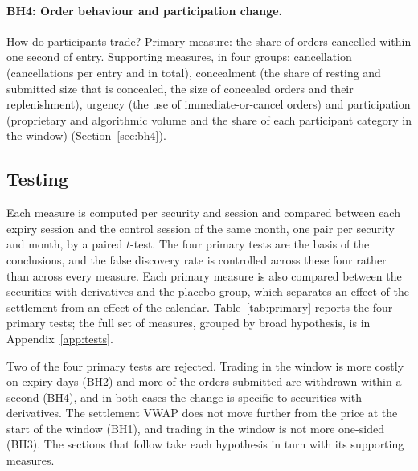 \paragraph{BH4: Order behaviour and participation change.} How do participants trade? Primary
measure: the share of orders cancelled within one second of entry. Supporting measures, in four
groups: cancellation (cancellations per entry and in total), concealment (the share of resting
and submitted size that is concealed, the size of concealed orders and their replenishment),
urgency (the use of immediate-or-cancel orders) and participation (proprietary and algorithmic
volume and the share of each participant category in the window) (Section~\ref{sec:bh4}).

\subsection{Testing}

Each measure is computed per security and session and compared between each expiry session and
the control session of the same month, one pair per security and month, by a paired $t$-test.
The four primary tests are the basis of the conclusions, and the false discovery rate is
controlled across these four rather than across every measure. Each primary measure is also
compared between the securities with derivatives and the placebo group, which separates an
effect of the settlement from an effect of the calendar. Table~\ref{tab:primary} reports the
four primary tests; the full set of measures, grouped by broad hypothesis, is in
Appendix~\ref{app:tests}.

\begin{table}[htbp]
\centering
\small
\caption{The four primary tests. Expiry and control are averages over securities; $d$ is
Cohen's $d$ on the paired differences and $p$ the paired $t$-test. $p \times 4$ is the Bonferroni
adjustment for the four primary tests. Placebo $p$ is the Welch test of whether the
expiry-minus-control difference is larger in the securities with derivatives than in the placebo
group. $^{\ast}$ rejected under false discovery rate control across the four primary tests at
$\alpha = \TestAlpha{}$.}
\label{tab:primary}
\resizebox{\textwidth}{!}{}
\end{table}

Two of the four primary tests are rejected. Trading in the window is more costly on expiry days
(BH2) and more of the orders submitted are withdrawn within a second (BH4), and in both cases the
change is specific to securities with derivatives. The settlement VWAP does not move further from
the price at the start of the window (BH1), and trading in the window is not more one-sided
(BH3). The sections that follow take each hypothesis in turn with its supporting measures.
